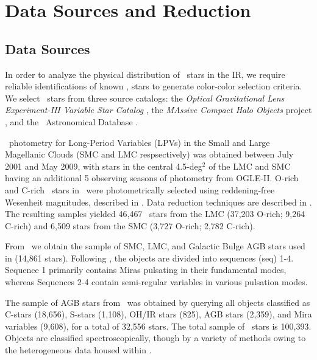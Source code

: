 \section{Data Sources and Reduction}
\label{sec:data}
\subsection{Data Sources}
In order to analyze the physical distribution of \agb\, stars in the IR, we require reliable identifications of known \agb, stars to generate color-color selection criteria. We select \agb\, stars from three source catalogs: the {\it Optical Gravitational Lens Experiment-III Variable Star Catalog} \citep[\ogle,][]{2008AcA....58...69U,2009AcA....59..239S,2011AcA....61..217S}, the {\it MAssive Compact Halo Objects} project \citep[\macho,][]{1997ApJ...482...89A}, and the \simbad\, Astronomical Database \citep{2000A&AS..143....9W}. 

\ogle\, photometry for Long-Period Variables (LPVs) in the Small and Large Magellanic Clouds (SMC and LMC respsectively) was obtained between July 2001 and May 2009, with stars in the central 4.5-deg$^2$ of the LMC and SMC having an additional 5 observing seasons of photometry from OGLE-II. O-rich and C-rich \agb\, stars in \ogle\, were photometrically selected using reddening-free Wesenheit magnitudes, described in \cite{2009AcA....59..239S,2011AcA....61..217S}. Data reduction techniques are described in \cite{2008AcA....58...69U}. The resulting samples yielded 46,467 \agb\, stars from the LMC (37,203 O-rich; 9,264 C-rich) and 6,509 stars from the SMC (3,727 O-rich; 2,782 C-rich). 

From \macho\, we obtain the sample of SMC, LMC, and Galactic Bulge AGB stars used in \cite{2008AJ....136.1242F} (14,861 stars). Following \cite{2008AJ....136.1242F}, the objects are divided into sequences (seq) 1-4. Sequence 1 primarily contains Miras pulsating in their fundamental modes, whereas Sequences 2-4 contain semi-regular variables in various pulsation modes.

The sample of AGB stars from \simbad\, was obtained by querying all objects classified as C-stars (18,656), S-stars (1,108), OH/IR stars (825), AGB stars (2,359), and Mira variables (9,608), for a total of 32,556 stars. The total sample of \agb\, stars is 100,393. Objects are classified spectroscopically, though by a variety of methods owing to the heterogeneous data housed within \simbad.

